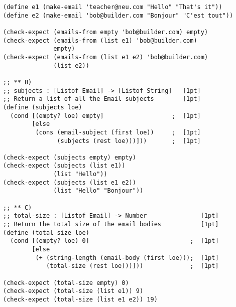 \documentclass[12pt]{article}                   %
\newenvironment{solution}{}{}
\begin{document}
\begin{problem}
\begin{solution}
\begin{verbatim}
(define e1 (make-email 'teacher@neu.com "Hello" "That's it"))
(define e2 (make-email 'bob@builder.com "Bonjour" "C'est tout"))

(check-expect (emails-from empty 'bob@builder.com) empty)
(check-expect (emails-from (list e1) 'bob@builder.com)
              empty)
(check-expect (emails-from (list e1 e2) 'bob@builder.com)
              (list e2))

;; ** B)
;; subjects : [Listof Email] -> [Listof String]   [1pt]
;; Return a list of all the Email subjects        [1pt]
(define (subjects loe)
  (cond [(empty? loe) empty]                   ;  [1pt]
        [else
         (cons (email-subject (first loe))     ;  [1pt]
               (subjects (rest loe)))]))       ;  [1pt]

(check-expect (subjects empty) empty)
(check-expect (subjects (list e1))
              (list "Hello"))
(check-expect (subjects (list e1 e2))
              (list "Hello" "Bonjour"))

;; ** C)
;; total-size : [Listof Email] -> Number               [1pt]
;; Return the total size of the email bodies           [1pt]
(define (total-size loe)
  (cond [(empty? loe) 0]                            ;  [1pt]
        [else
         (+ (string-length (email-body (first loe)));  [1pt]
            (total-size (rest loe)))]))             ;  [1pt]

(check-expect (total-size empty) 0)
(check-expect (total-size (list e1)) 9)
(check-expect (total-size (list e1 e2)) 19)
\end{verbatim}
\end{solution}
\end{problem}
\ifrubric\bigskip\else
\newpage
\fi
\end{document}
